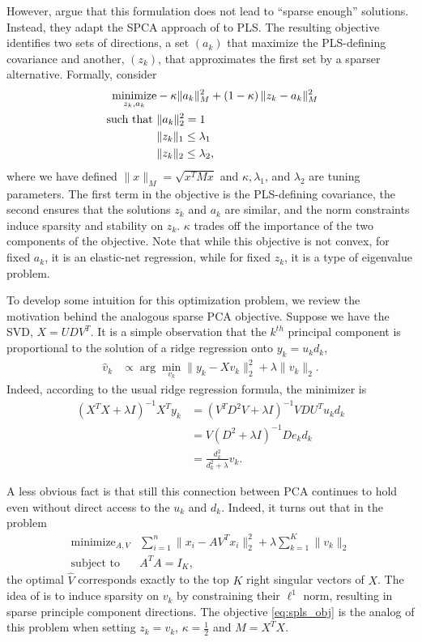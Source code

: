 \documentclass{article}
\begin{document}
However, \cite{chun2010sparse} argue that this formulation does not lead to
``sparse enough'' solutions. Instead, they adapt the SPCA approach of
\cite{zou2006sparse} to PLS. The resulting objective identifies two sets of
directions, a set $\left(a_k\right)$ that maximize the PLS-defining covariance
and another, $\left(z_k\right)$, that approximates the first set by a sparser
alternative. Formally, consider
\begin{align}
  \label{eq:spls_obj}
  \mathop\mathrm{minimize}_{z_k, a_k} &-\kappa \|a_k\|_M^2 + \left(1 - \kappa\right) \|z_k - a_k\|_M^2 \\
  \text{ such that } & \|a_k\|_2^2 = 1 \nonumber \\
  &\|z_k\|_1 \leq \lambda_1 \nonumber \\
  &\|z_k\|_2 \leq \lambda_2, \nonumber
\end{align}
where we have defined $\|x\|_M = \sqrt{x^T M x}$ and $\kappa, \lambda_1$, and
$\lambda_2$ are tuning parameters. The first term in the objective is the
PLS-defining covariance, the second ensures that the solutions $z_k$ and $a_k$
are similar, and the norm constraints induce sparsity and stability on $z_k$.
$\kappa$ trades off the importance of the two components of the objective. Note
that while this objective is not convex, for fixed $a_k$, it is an elastic-net
regression, while for fixed $z_k$, it is a type of eigenvalue problem.

To develop some intuition for this optimization problem, we review the
motivation behind the analogous sparse PCA objective. Suppose we have the SVD,
$X = UDV^T$. It is a simple observation that the $k^{th}$ principal component is
proportional to the solution of a ridge regression onto $y_k = u_k d_k$,
\begin{align*}
  \hat{v}_k &\propto \arg \min_{v_k} \|y_k - X v_k\|_2^2 + \lambda \|v_k \|_2.
\end{align*}
Indeed, according to the usual ridge regression formula, the minimizer is
\begin{align*}
  \left(X^TX + \lambda I\right)^{-1} X^T y_k &= \left(V^T D^2 V + \lambda I\right)^{-1} V D U^T u_k d_k \\
  &= V\left(D^2 + \lambda I\right)^{-1} D e_k d_k \\
  &= \frac{d_k^2}{d_k^2 + \lambda}v_k.
\end{align*}

A less obvious fact is that still this connection between PCA continues to hold
even without direct access to the $u_k$ and $d_k$. Indeed, it turns out that in
the problem
\begin{align}
  \label{eq:spca_obj_reform}
  \text{minimize}_{A, V} &\sum_{i = 1}^{n} \|x_i - AV^T x_i\|_2^2 +
  \lambda \sum_{k = 1}^{K} \|v_k\|_2 \\
  \text{subject to } &A^T A = I_K, \nonumber
\end{align}
the optimal $\hat{V}$ corresponds exactly to the top $K$ right singular vectors
of $X$. The idea of \cite{zou2006sparse} is to induce sparsity on $v_k$ by
constraining their $\ell^1$ norm, resulting in sparse principle component
directions. The objective \ref{eq:spls_obj} is the analog of this problem when
setting $z_k = v_k$, $\kappa = \frac{1}{2}$ and $M = X^T X$.
\end{document}
